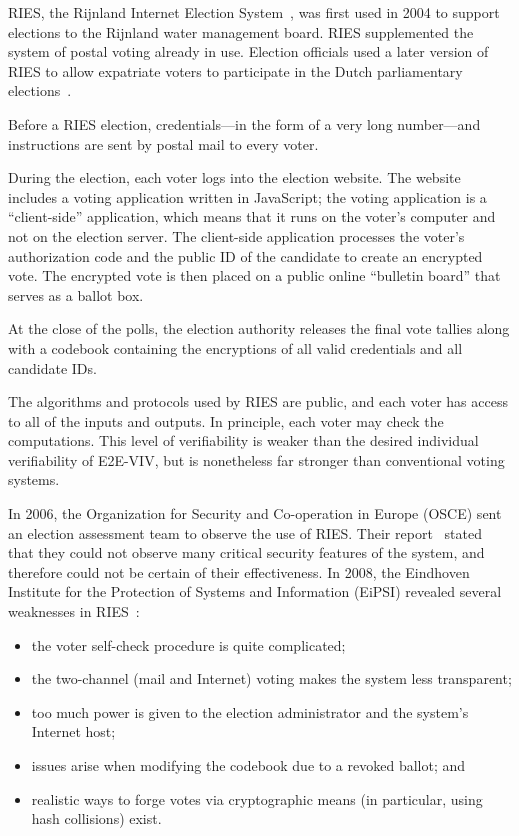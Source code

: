 RIES, the Rijnland Internet Election System~\cite{hubbers2004}, was
first used in 2004 to support elections to the Rijnland water
management board. RIES supplemented the system of postal voting
already in use. Election officials used a later version of RIES to
allow expatriate voters to participate in the Dutch parliamentary
elections~\cite{gonggrijp2009}.

Before a RIES election, credentials---in the form of a very long
number---and instructions are sent by postal mail to every voter.

During the election, each voter logs into the election website. The
website includes a voting application written in JavaScript; the
voting application is a ``client-side'' application, which means that
it runs on the voter's computer and not on the election server. The
client-side application processes the voter's authorization code and
the public ID of the candidate to create an encrypted
vote. The encrypted vote is then placed on a public online ``bulletin
board'' that serves as a ballot box.

At the close of the polls, the election authority releases the final
vote tallies along with a codebook containing the encryptions of all
valid credentials and all candidate IDs.

The algorithms and protocols used by RIES are public, and each voter
has access to all of the inputs and outputs. In principle, each voter
may check the computations. This level of verifiability is weaker than
the desired individual verifiability of E2E-VIV, but is nonetheless
far stronger than conventional voting systems.

In 2006, the Organization for Security and Co-operation in Europe
(OSCE) sent an election assessment team to observe the use of
RIES. Their report~\cite{osce2007} stated that they could not observe
many critical security features of the system, and therefore could not
be certain of their effectiveness. In 2008, the Eindhoven Institute
for the Protection of Systems and Information (EiPSI) revealed several
weaknesses in RIES~\cite{hubbers2008}:

\begin{itemize}
  \item the voter self-check procedure is quite complicated;
  \item the two-channel (mail and Internet) voting makes the system
    less transparent;
  \item too much power is given to the election administrator and the
    system's Internet host;
  \item issues arise when modifying the codebook due to a revoked
    ballot; and
  \item realistic ways to forge votes via cryptographic means (in
    particular, using hash collisions) exist.
\end{itemize}

